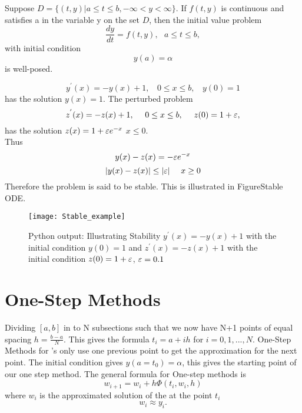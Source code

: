 \begin{theorem}
Suppose $D= \{(t,y) | a\leq t \leq b, -\infty <y < \infty \}$.
If $f(t,y)$ is continuous and satisfies a  in the variable y on
the set $D$, then the initial value problem 
\[\frac{dy}{dt}=f(t,y), \ \ \  a\leq t \leq b,\]
with initial condition
\[y(a) = \alpha \]
is well-posed.
\end{theorem}
\begin{example}
\[y^{'}(x)=-y(x)+1, \ \ \ \ 0\leq x \leq b, \ \ \ \ y(0)=1 \]
has the solution $y(x)=1$. The perturbed problem
\[z^{'}(x)=-z(x)+1, \ \ \ \ 0\leq x \leq b, \ \ \ \ z(0)=1+\va, \]
has the solution $z(x)=1+\varepsilon e^{-x}$ $x \leq 0$.\\
Thus 
\[y(x)-z(x)=-\varepsilon e^{-x} \]
\[|y(x)-z(x)|\leq |\varepsilon| \ \ \ \ x \geq 0 \]
Therefore the problem is said to be stable. This is illustrated in Figure{Stable ODE}. 
\end{example}
\begin{figure}[h]
\centering
\texttt{[image: Stable\_example]}
\caption{Python output: Illustrating Stability $y^{'}(x)=-y(x)+1$ with the initial condition $y(0)=1$ and $z^{'}(x)=-z(x)+1$ with the initial condition $z(0)=1+\varepsilon$, $\varepsilon=0.1$}
\label{Stable ODE}
\end{figure}


\section{One-Step Methods}
Dividing $[a,b]$ in to N subsections
such that we now have N+1 points of equal spacing $h=\frac{b-a}{N}$. This gives
the formula $t_i=a+ih$ for $i=0,1,...,N$.  
One-Step Methods for 's only use one previous point to get
the approximation for the next point.  The initial condition gives $y(a=t_0)=\alpha$, this gives the starting point of our one step method.  The general formula
for One-step methods is 
\[ w_{i+1}=w_i+h\Phi(t_i,w_i,h) \] 
where $w_i$ is the approximated solution of the  at the point $t_i$
\[w_i\approx y_i.\]

